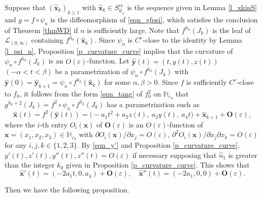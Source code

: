 \documentclass{amsart}
\theoremstyle{definition}
\numberwithin{equation}{section}
\numberwithin{figure}{section}
\begin{document}
Suppose that $(\widehat{\boldsymbol{x}}_k)_{k\geq 1}$ with $\widehat{\boldsymbol{x}}_k\in S_{\widehat{\underline{w}}_k}^{\mathrm{cs}}$ is the sequence given in Lemma \ref{l_xkinS} and 
$g=f\circ \psi_n$ is the diffeomorphism of \eqref{eqn_gfpsi}, 
which satisfies the conclusion of Theorem \ref{thmWD} if $n$ is sufficiently large.
Note that $f^{\widehat n_k}(J_k)$ is the leaf of $\mathcal{L}_{(0,\infty)}$ containing $f^{\widehat n_k}(\widehat{\boldsymbol{x}}_k)$.
Since $\psi_n$ is $C^r$-close to the identity by Lemma \ref{l_psi_n}, 
Proposition \ref{p_curvature_curve} implies that the curvature of $\psi_n\circ f^{\widehat n_k}(J_k)$ 
is an $O(\varepsilon)$-function.
Let $\widehat{\boldsymbol{y}}(t)=(t,y(t),z(t))$ $(-\alpha<t<\beta)$ be a parametrization of $\psi_n\circ f^{\widehat n_k}(J_k)$ with 
$\widehat{\boldsymbol{y}}(0)=\widehat{\boldsymbol{y}}_{k+1}=\psi_n\circ f^{\widehat n_k}(\widehat{\boldsymbol{x}}_k)$ for some $\alpha,\beta>0$.
Since $f$ is sufficiently $C^r$-close to $f_0$, 
it follows from the form \eqref{eqn_tang} of $f_0^2$ on $\mathbb{H}_{\varepsilon_0}$ that 
$g^{\widehat n_k+2}(J_k)=f^2\circ \psi_n\circ f^{\widehat n_k}(J_k)$ has a parametrization such as 
$$\widehat{\boldsymbol{x}}(t)=f^2(\widehat{\boldsymbol{y}}(t))=\bigl(-a_1t^2+a_2z(t),\ a_2y(t),\ a_4t\bigr)+\widehat{\boldsymbol{x}}_{k+1}+\boldsymbol{O}(\varepsilon),$$
where the $i$-th entry $O_i(\boldsymbol{x})$ of $\boldsymbol{O}(\varepsilon)$ is an $O(\varepsilon)$-function of $\boldsymbol{x}=(x_1,x_2,x_3)\in \mathbb{H}_{\varepsilon_0}$ with 
$\partial O_i(\boldsymbol{x})/\partial x_j=O(\varepsilon)$, $\partial^2 O_i(\boldsymbol{x})/\partial x_j\partial x_k=O(\varepsilon)$ for any $i,j,k\in \{1,2,3\}$.
By \eqref{eqn_y'} and Proposition \ref{p_curvature_curve}, $y'(t),z'(t),y''(t),z''(t)=O(\varepsilon)$ 
if necessary supposing that $\widehat n_1$ is greater than the integer $k_0$ given in 
Proposition \ref{p_curvature_curve}.
This shows that 
\begin{equation}\label{eqn_whx'}
\widehat{\boldsymbol{x}}'(t)=(-2a_1t, 0, a_4)+\boldsymbol{O}(\varepsilon),\quad \widehat{\boldsymbol{x}}''(t)=(-2a_1, 0, 0)+\boldsymbol{O}(\varepsilon).
\end{equation}



Then we have the following proposition.
\end{document}
